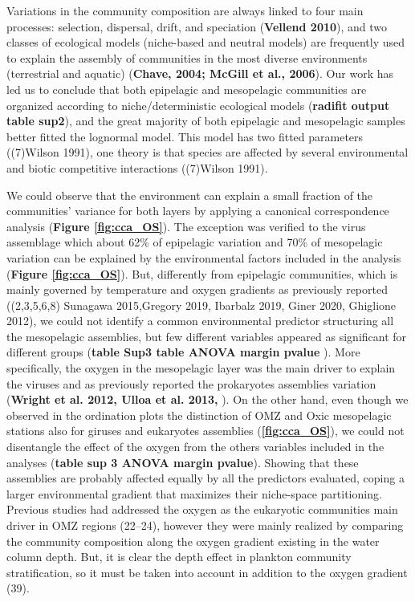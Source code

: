 \documentclass[fleqn,10pt]{wlscirep}
\begin{document}
Variations in the community composition are always linked to four main processes: selection, dispersal, drift, and speciation (\textbf{Vellend 2010}), and two classes of ecological models (niche-based and neutral models) are frequently used to explain the assembly of communities in the most diverse environments (terrestrial and aquatic) (\textbf{Chave, 2004; McGill et al., 2006}). Our work has led us to conclude that both epipelagic and mesopelagic communities are organized according to niche/deterministic ecological models (\textbf{radifit output table sup2}), and the great majority of both epipelagic and mesopelagic samples better fitted the lognormal model. This model has two fitted parameters ((7)Wilson 1991), one theory is that species are affected by several environmental and biotic competitive interactions ((7)Wilson 1991). 

We could observe that the environment can explain a small fraction of the communities’ variance for both layers by applying a canonical correspondence analysis (\textbf{Figure \ref{fig:cca_OS}}). The exception was verified to the virus assemblage which about 62\% of epipelagic variation and 70\% of mesopelagic variation can be explained by the environmental factors included in the analysis (\textbf{Figure \ref{fig:cca_OS}}). But, differently from epipelagic communities, which is mainly governed by temperature and oxygen gradients as previously reported ((2,3,5,6,8) Sunagawa 2015,Gregory 2019, Ibarbalz 2019, Giner 2020, Ghiglione 2012), we could not identify a common environmental predictor structuring all the mesopelagic assemblies, but few different variables appeared as significant for different groups (\textbf{table Sup3 table ANOVA margin pvalue }). More specifically, the oxygen in the mesopelagic layer was the main driver to explain the viruses and as previously reported the prokaryotes assemblies variation (\textbf{Wright et al. 2012, Ulloa et al. 2013, }). On the other hand, even though we observed in the ordination plots the distinction of OMZ and Oxic mesopelagic stations also for giruses and eukaryotes assemblies (\textbf{\ref{fig:cca_OS}}), we could not disentangle the effect of the oxygen from the others variables included in the analyses (\textbf{table sup 3 ANOVA margin pvalue}). Showing that these assemblies are probably affected equally by all the predictors evaluated, coping a larger environmental gradient that maximizes their niche-space partitioning. Previous studies had addressed the oxygen as the eukaryotic communities main driver in OMZ regions (22–24), however they were mainly realized by comparing the community composition along the oxygen gradient existing in the water column depth. But, it is clear the depth effect in plankton community stratification, so it must be taken into account in addition to the oxygen gradient (39).
\end{document}
